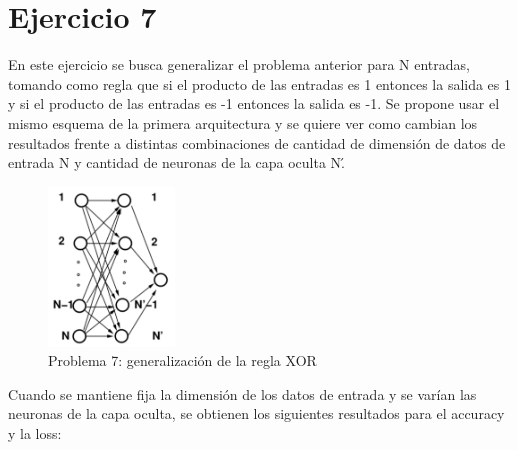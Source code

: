 \section{Ejercicio 7}

En este ejercicio se busca generalizar el problema anterior para N entradas, tomando como regla que si el producto de las entradas es 1 entonces la salida es 1 y si el producto de las entradas es -1 entonces la salida es -1. Se propone usar el mismo esquema de la primera arquitectura y se quiere ver como cambian los resultados frente a distintas combinaciones de cantidad de dimensión de datos de entrada N y cantidad de neuronas de la capa oculta N\'.

\begin{figure}[H]
    \centering
    \includegraphics[width=0.3\textwidth]{image/neuronas.png}
    \caption{Problema 7: generalización de la regla XOR}
    \label{fig:my_label}
\end{figure}

Cuando se mantiene fija la dimensión de los datos de entrada y se varían las neuronas de la capa oculta, se obtienen los siguientes resultados para el accuracy y la loss:

